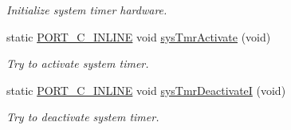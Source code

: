 \begin{DoxyCompactItemize}
\begin{DoxyCompactList}\small\item\em Initialize system timer hardware. \end{DoxyCompactList}\item 
static \hyperlink{group__template__compiler_ga87952d6e574c7f437503926e833ba345}{P\-O\-R\-T\-\_\-\-C\-\_\-\-I\-N\-L\-I\-N\-E} void \hyperlink{group__kern__impl_gaac3698a7627e9d0b7b1f0d5f741d2816}{sys\-Tmr\-Activate} (void)
\begin{DoxyCompactList}\small\item\em Try to activate system timer. \end{DoxyCompactList}\item 
static \hyperlink{group__template__compiler_ga87952d6e574c7f437503926e833ba345}{P\-O\-R\-T\-\_\-\-C\-\_\-\-I\-N\-L\-I\-N\-E} void \hyperlink{group__kern__impl_gab564a700462dce0be7ba31f2d3022f7b}{sys\-Tmr\-Deactivate\-I} (void)
\begin{DoxyCompactList}\small\item\em Try to deactivate system timer. \end{DoxyCompactList}\end{DoxyCompactItemize}
